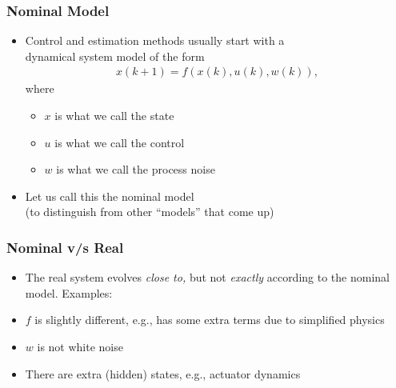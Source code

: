 \documentclass[aspectratio=169,handout]{beamer} 	%
\begin{document}
\begin{frame}
	\frametitle{Nominal Model}
	\begin{itemize}[<+->]
		\itemsep\baselineskip
		\item Control and estimation methods usually start with a \\ dynamical system 
		model of the form
		\begin{align*}
			x(k + 1) = f( x(k), u(k), w(k) ),
		\end{align*}
		where%
		\begin{itemize}
			\item $x$ is what we call the {state}
			\item $u$ is what we call the {control}
			\item $w$ is what we call the {process noise}
		\end{itemize}
		
		\item Let us call this the \alert{nominal model} \\
		(to distinguish from other ``models'' that come up)
		
	\end{itemize}
	
\end{frame}



\begin{frame}
	\frametitle{Nominal v/s Real}
	\begin{itemize}[<+->]
		\itemsep\baselineskip
		\item The real system evolves \emph{close to,} 
		but not \emph{exactly} according to the nominal model. Examples:
		
		\item $f$ is slightly different, e.g., has some extra terms 
		due to simplified physics
		
		\item $w$ is not white noise
		
		\item There are extra (hidden) states, e.g., actuator dynamics
		
		
	\end{itemize}
	
\end{frame}
\end{document}
